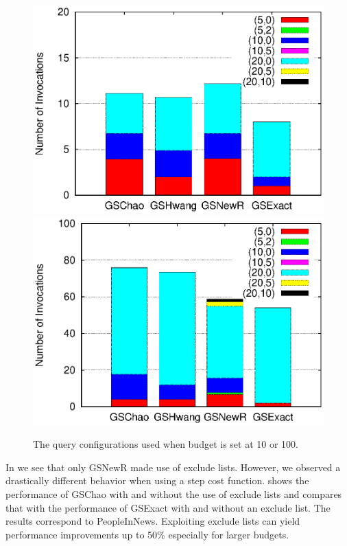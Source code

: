 \begin{figure}[t]
\vspace{-10pt}
   	 \includegraphics[clip,scale=0.32]{figs/queryConfBudget10.eps}
	\includegraphics[clip,scale=0.32]{figs/queryConfBudget100.eps}
	\vspace{-10pt}
	\caption{The query configurations used when budget is set at 10 or 100.}\label{fig:queryconf}
		\vspace{-5pt}
\end{figure}

\iftr
{} In  we see that only GSNewR made use of exclude lists. However, we observed a drastically different behavior when using a step cost function.  shows the performance of GSChao with and without the use of exclude lists and compares that with the performance of GSExact with and without an exclude list. The results correspond to PeopleInNews. Exploiting exclude lists can yield performance improvements up to 50\% especially for larger budgets.

